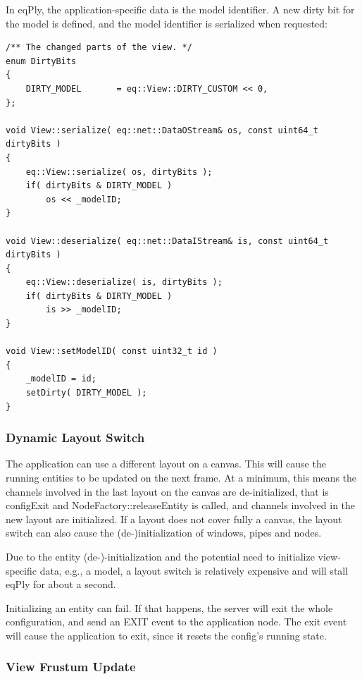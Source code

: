 \documentclass[10pt,a4]{scrartcl}
\begin{document}
In \textsf{eqPly}, the application-specific data is the model
identifier. A new dirty bit for the model is defined, and the model
identifier is serialized when requested:

{\footnotesize\begin{lstlisting}
/** The changed parts of the view. */
enum DirtyBits
{
    DIRTY_MODEL       = eq::View::DIRTY_CUSTOM << 0,
};

void View::serialize( eq::net::DataOStream& os, const uint64_t dirtyBits )
{
    eq::View::serialize( os, dirtyBits );
    if( dirtyBits & DIRTY_MODEL )
        os << _modelID;
}

void View::deserialize( eq::net::DataIStream& is, const uint64_t dirtyBits )
{
    eq::View::deserialize( is, dirtyBits );
    if( dirtyBits & DIRTY_MODEL )
        is >> _modelID;
}

void View::setModelID( const uint32_t id )
{
    _modelID = id;
    setDirty( DIRTY_MODEL );
}
\end{lstlisting}}

\subsubsection{Dynamic Layout Switch}

The application can use a different layout on a canvas. This will cause
the running entities to be updated on the next frame. At a minimum, this
means the channels involved in the last layout on the canvas are
de-initialized, that is \textsf{configExit} and
\textsf{NodeFactory::releaseEntity} is called, and channels involved in
the new layout are initialized. If a layout does not cover fully a
canvas, the layout switch can also cause the (de-)initialization of
windows, pipes and nodes.

Due to the entity (de-)-initialization and the potential need to
initialize view-specific data, e.g., a model, a layout switch is
relatively expensive and will stall \textsf{eqPly} for about a second.

Initializing an entity can fail. If that happens, the server will exit
the whole configuration, and send an \textsf{EXIT} event to the
application node. The exit event will cause the application to exit,
since it resets the config's running state.


\subsubsection{View Frustum Update}
\end{document}
